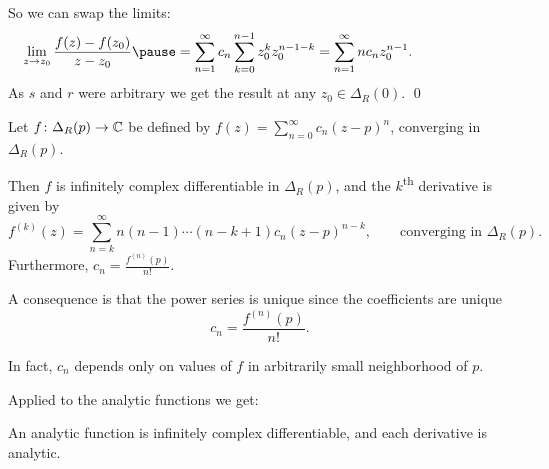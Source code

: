 \documentclass[10pt,aspectratio=169]{beamer}
\begin{document}
\begin{frame}

So we can swap the limits:
\[
\lim_{z \to z_0}
\frac{f(z)-f(z_0)}{z-z_0}
\pause
=
\sum_{n=1}^\infty c_n \sum_{k=0}^{n-1} z_0^k z_0^{n-1-k}
=
\sum_{n=1}^\infty n c_n z_0^{n-1} .
\qquad
\qquad
\qquad
\]
\pause
As $s$ and $r$ were arbitrary we get the result at any $z_0 \in \Delta_R(0)$.
\qed

\pause

\begin{corollary}
Let $f \colon \Delta_R(p) \to {\mathbb{C}}$ be defined by
\(\displaystyle
f(z) = \sum_{n=0}^\infty c_n {(z-p)}^n
\),
converging in $\Delta_R(p)$.

\pause
Then $f$ is infinitely complex differentiable in $\Delta_R(p)$,
and the $k$\textsuperscript{th} derivative is given by
\begin{equation*}
f^{(k)}(z) = \sum_{n=k}^\infty n(n-1)\cdots(n-k+1) c_n {(z-p)}^{n-k} ,
\qquad \text{converging in } \Delta_R(p) .
\end{equation*}
\pause
Furthermore,
\quad
$\displaystyle
c_n =
\frac{f^{(n)}(p)}{n!}
$.
\end{corollary}

\end{frame}

\begin{frame}

A consequence is that the power series is unique since
the coefficients are unique
\[
c_n =
\frac{f^{(n)}(p)}{n!} .
\]

\medskip
\pause

In fact, $c_n$ depends only on values of $f$ in arbitrarily small
neighborhood of $p$.

\medskip
\pause

Applied to the analytic functions we get:

\begin{corollary}
An analytic function is infinitely complex differentiable, and each
derivative is analytic.
\end{corollary}

\end{frame}
\end{document}
